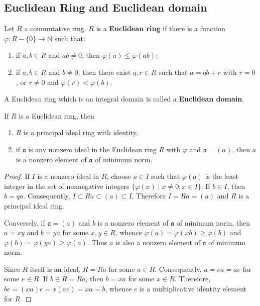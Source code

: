 \subsection{Euclidean Ring and Euclidean domain} %

\begin{definition}
    Let $R$ a commutative ring. $R$ is a \textbf{Euclidean ring} if there is a function $\varphi: R-\{0\} \rightarrow \mathbb{N}$ such that:
    \begin{enumerate}[label=(\roman*)]
        \item  if $a, b \in R$ and $ab \neq 0$, then $\varphi(a) \leq \varphi(ab)$;
        \item if $a, b \in R$ and $b \neq 0$, then there exist $q, r \in R$ such that $a=qb+r$ with $r=0$, or $r \neq 0$ and $\varphi(r)<\varphi(b)$.
    \end{enumerate}
    A Euclidean ring which is an integral domain is called a \textbf{Euclidean domain}.
\end{definition}

\begin{theorem}
    If $R$ is a Euclidean ring, then
    \begin{enumerate}
        \item
              $R$ is a principal ideal ring with identity.
        \item
              if $\mathfrak{a}$ is any nonzero ideal in the Euclidean ring $R$ with $\varphi$ and $\mathfrak{a}=(a)$, then $a$ is a nonzero element of $\mathfrak{a}$ of minimum norm.
    \end{enumerate}
    \begin{proof}
        If $I$ is a nonzero ideal in $R$, choose $a \in I$ such that $\varphi(a)$ is the least integer in the set of nonnegative integers $\{\varphi(x) \mid x \neq 0 ; x \in I\}$. If $b \in I$, then $b=q a$.
        Consequently, $I \subset R a \subset(a) \subset I$. Therefore $I=R a=(a)$ and $R$ is a principal ideal ring.

        Conversely, if $\mathfrak{a}=\left(a\right)$ and $b$ is a
        nonzero element of $\mathfrak{a}$ of minimum norm, then $a=xy$ and $b=ya$ for some $x,y\in R$, whence $\varphi\left(a\right)=\varphi\left(xb\right)\geq \varphi(b)$ and $\varphi\left(b\right)=\varphi\left(ya\right)\geq \varphi(a)$. Thus $a$ is also a nonzero element of $\mathfrak{a}$ of minimum norm.

        Since $R$ itself is an ideal, $R=R a$ for some $a \in R$. Consequently, $a=e a=a e$ for some $e \in R$. If $b \in R=R a$, then $b=x a$ for some $x \in R$. Therefore, $b e=(x a) e =x(a e)=x a=b$, whence $e$ is a multiplicative identity element for $R$.
    \end{proof}
\end{theorem}

